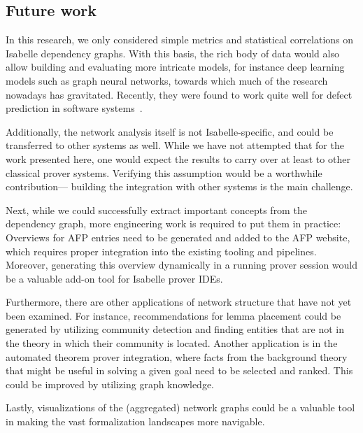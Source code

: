 \subsection{Future work}
In this research,
we only considered simple metrics and statistical correlations on Isabelle dependency graphs.
With this basis, the rich body of data would also allow building and evaluating more intricate models,
for instance deep learning models such as graph neural networks,
towards which much of the research nowadays has gravitated.
Recently, they were found to work quite well for defect prediction in software systems~\cite{GNNSoftwareDefects2022Sikic}.

Additionally,
the network analysis itself is not Isabelle-specific,
and could be transferred to other systems as well.
While we have not attempted that for the work presented here,
one would expect the results to carry over at least to other classical prover systems.
Verifying this assumption would be a worthwhile contribution---%
building the integration with other systems is the main challenge.

Next, while we could successfully extract important concepts from the dependency graph,
more engineering work is required to put them in practice:
Overviews for AFP entries need to be generated and added to the AFP website,
which requires proper integration into the existing tooling and pipelines.
Moreover, generating this overview dynamically in a running prover session
would be a valuable add-on tool for Isabelle prover IDEs.

Furthermore, there are other applications of network structure that have not yet been examined.
For instance, recommendations for lemma placement could be generated by utilizing community detection and finding entities that are not in the theory in which their community is located.
Another application is in the automated theorem prover integration,
where facts from the background theory that might be useful in solving a given goal need to be selected and ranked.
This could be improved by utilizing graph knowledge.

Lastly, visualizations of the (aggregated) network graphs could be a valuable tool in making the vast formalization landscapes more navigable.